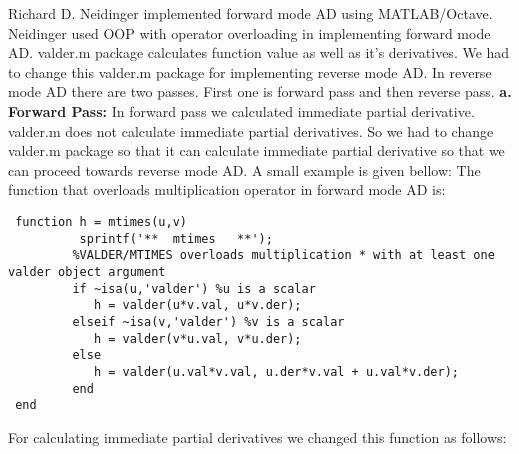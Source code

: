 \documentclass[paper=letter, fontsize=12pt]{scrartcl} %
\begin{document}
\normalsize
\newline
Richard D. Neidinger implemented forward mode AD using MATLAB/Octave. Neidinger used OOP with operator overloading in implementing forward mode AD. valder.m package calculates function value as well as it's derivatives. We had to change this valder.m package for implementing reverse mode AD. In reverse mode AD there are two passes. First one is forward pass and then reverse pass. 
\newline
\linebreak
\textbf{	a. Forward Pass: }
In forward pass we calculated immediate partial derivative. valder.m does not calculate immediate partial derivatives. So we had to change valder.m package so that it can calculate immediate partial derivative so that we can proceed towards reverse mode AD. A small example is given bellow:
The function that overloads multiplication operator in forward mode AD is:
\begin{lstlisting}
 function h = mtimes(u,v)
          sprintf('**  mtimes   **');
         %VALDER/MTIMES overloads multiplication * with at least one valder object argument
         if ~isa(u,'valder') %u is a scalar
            h = valder(u*v.val, u*v.der);
         elseif ~isa(v,'valder') %v is a scalar
            h = valder(v*u.val, v*u.der);
         else
            h = valder(u.val*v.val, u.der*v.val + u.val*v.der);
         end
 end        
\end{lstlisting}
For calculating immediate partial derivatives we changed this function as follows:
\end{document}
